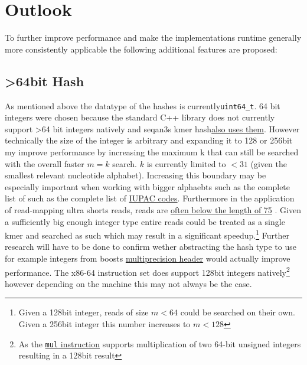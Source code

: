 \chapter{Outlook}

To further improve performance and make the implementations runtime generally
more consistently applicable the following additional features are proposed:

\section{>64bit Hash}
As mentioned above the datatype of the hashes is currently\lstinline{uint64_t}.
64 bit integers were chosen because the standard C++ library does
not currently support >64 bit integers natively and seqan3s kmer hash\href{http://docs.seqan.de/seqan/3-master-user/group__views.html\#ga6e598d6a021868f704d39df73252974f}{also uses them}.
However technically the size of the integer is arbitrary and expanding it to 128 or 256bit my improve performance
by increasing the maximum k that can still be searched with the overall faster $m=k$ search. $k$ is currently
limited to $<31$ (given the smallest relevant nucleotide alphabet). Increasing this boundary
may be especially important when working with bigger alphaebts such as the complete list of such as the complete list of
\href{https://www.bioinformatics.org/sms/iupac.html}{IUPAC codes}. Furthermore in the application
of read-mapping ultra shorts reads, reads are \href{https://www.illumina.com/science/technology/next-generation-sequencing/plan-experiments/read-length.html}{often below the length of 75}
. Given a sufficiently big enough integer type entire reads could be treated as a single kmer and searched as such which
may result in a significant speedup.\footnote{Given a 128bit integer, reads of size $m<64$ could be searched on their own. Given a 256bit integer this number increases to $m<128$}
Further research will have to be done to confirm wether abstracting the hash type to use for example
integers from boosts \href{https://www.boost.org/doc/libs/1_62_0/libs/multiprecision/doc/html/boost_multiprecision/tut/ints/cpp_int.html}{multiprecision header}
would actually improve performance. The x86-64 instruction set does support 128bit integers natively\footnote{As the \href{https://www.felixcloutier.com/x86/mul}{\lstinline{mul} instruction} supports multiplication of two 64-bit unsigned integers resulting in a 128bit result}
however depending on the machine this may not always be the case.

